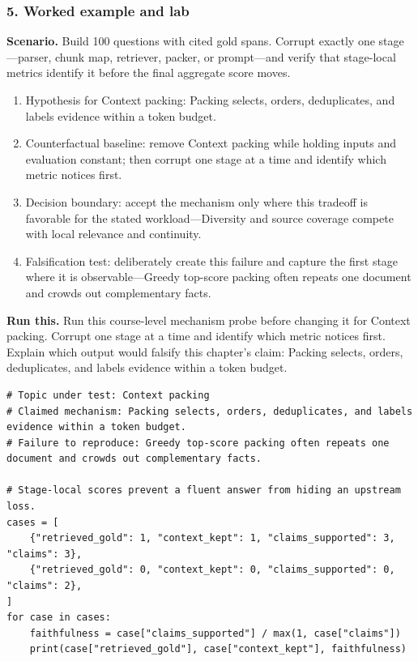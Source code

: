 \subsubsection*{5. Worked example and lab}
\textbf{Scenario.} Build 100 questions with cited gold spans. Corrupt exactly one stage—parser, chunk map, retriever, packer, or prompt—and verify that stage-local metrics identify it before the final aggregate score moves.
\begin{enumerate}
\item Hypothesis for Context packing: Packing selects, orders, deduplicates, and labels evidence within a token budget.
\item Counterfactual baseline: remove Context packing while holding inputs and evaluation constant; then corrupt one stage at a time and identify which metric notices first.
\item Decision boundary: accept the mechanism only where this tradeoff is favorable for the stated workload—Diversity and source coverage compete with local relevance and continuity.
\item Falsification test: deliberately create this failure and capture the first stage where it is observable—Greedy top-score packing often repeats one document and crowds out complementary facts.
\end{enumerate}
\textbf{Run this.} Run this course-level mechanism probe before changing it for Context packing. Corrupt one stage at a time and identify which metric notices first. Explain which output would falsify this chapter's claim: Packing selects, orders, deduplicates, and labels evidence within a token budget.
\begin{Verbatim}[fontsize=\scriptsize]
# Topic under test: Context packing
# Claimed mechanism: Packing selects, orders, deduplicates, and labels evidence within a token budget.
# Failure to reproduce: Greedy top-score packing often repeats one document and crowds out complementary facts.

# Stage-local scores prevent a fluent answer from hiding an upstream loss.
cases = [
    {"retrieved_gold": 1, "context_kept": 1, "claims_supported": 3, "claims": 3},
    {"retrieved_gold": 0, "context_kept": 0, "claims_supported": 0, "claims": 2},
]
for case in cases:
    faithfulness = case["claims_supported"] / max(1, case["claims"])
    print(case["retrieved_gold"], case["context_kept"], faithfulness)
\end{Verbatim}

